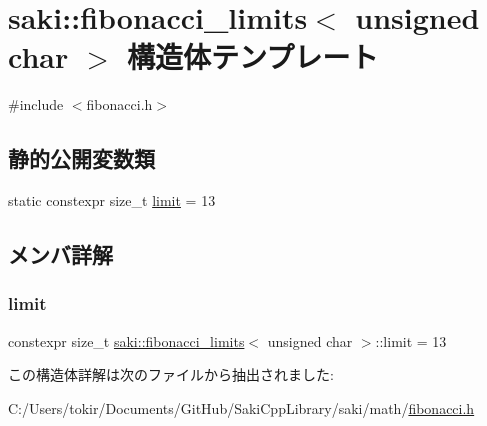 \hypertarget{structsaki_1_1fibonacci__limits_3_01unsigned_01char_01_4}{}\section{saki\+:\+:fibonacci\+\_\+limits$<$ unsigned char $>$ 構造体テンプレート}
\label{structsaki_1_1fibonacci__limits_3_01unsigned_01char_01_4}


{\ttfamily \#include $<$fibonacci.\+h$>$}

\subsection*{静的公開変数類}
\begin{DoxyCompactItemize}
\item 
static constexpr size\+\_\+t \mbox{\hyperlink{structsaki_1_1fibonacci__limits_3_01unsigned_01char_01_4_a150f4f870a9c33d4d596e6abdbf5281c}{limit}} = 13
\end{DoxyCompactItemize}


\subsection{メンバ詳解}
\mbox{\label{structsaki_1_1fibonacci__limits_3_01unsigned_01char_01_4_a150f4f870a9c33d4d596e6abdbf5281c}} 
\subsubsection{\texorpdfstring{limit}{limit}}
{\footnotesize\ttfamily constexpr size\+\_\+t \mbox{\hyperlink{structsaki_1_1fibonacci__limits}{saki\+::fibonacci\+\_\+limits}}$<$ unsigned char $>$\+::limit = 13\hspace{0.3cm}{\ttfamily [static]}}



この構造体詳解は次のファイルから抽出されました\+:\begin{DoxyCompactItemize}
\item 
C\+:/\+Users/tokir/\+Documents/\+Git\+Hub/\+Saki\+Cpp\+Library/saki/math/\mbox{\hyperlink{fibonacci_8h}{fibonacci.\+h}}\end{DoxyCompactItemize}
